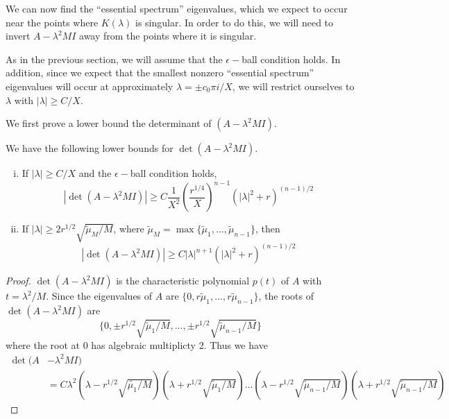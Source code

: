 \documentclass[thesis.tex]{subfiles}
\begin{document}
We can now find the ``essential spectrum'' eigenvalues, which we expect to occur near the points where $K(\lambda)$ is singular. In order to do this, we will need to invert $A - \lambda^2 MI$ away from the points where it is singular.

As in the previous section, we will assume that the $\epsilon-$ball condition holds. In addition, since we expect that the smallest nonzero ``essential spectrum'' eigenvalues will occur at approximately $\lambda = \pm c_0 \pi i / X$, we will restrict ourselves to $\lambda$ with $|\lambda| \geq C/X$.

We first prove a lower bound the determinant of $(A - \lambda^2 MI)$.

\begin{lemma}\label{detAboundlemma}
We have the following lower bounds for $\det(A - \lambda^2 M I)$.
\begin{enumerate}[(i)]
\item If $|\lambda| \geq C/X$ and the $\epsilon-$ball condition holds,
\begin{equation}\label{detAbound1}
|\det(A - \lambda^2 M I)|
\geq C \frac{1}{X^2} \left( \frac{r^{1/4}}{X} \right)^{n-1} \left( |\lambda|^2 + r \right)^{(n-1)/2}
\end{equation}

\item If $|\lambda| \geq 2 r^{1/2} \sqrt{\tilde{\mu}_M/M}$, where $\tilde{\mu}_M = \max\{\tilde{\mu}_1, \dots, \tilde{\mu}_{n-1} \}$, then
\begin{equation}\label{detAbound2}
|\det(A - \lambda^2 M I)|
\geq C |\lambda|^{n+1} \left( |\lambda|^2 + r \right)^{(n-1)/2}
\end{equation}

\end{enumerate}
\begin{proof}
$\det(A - \lambda^2 MI)$ is the characteristic polynomial $p(t)$ of $A$ with $t = \lambda^2 / M$. Since the eigenvalues of $A$ are $\{0, r \tilde{\mu}_1, \dots, r\tilde{\mu}_{n-1}\}$, the roots of $\det(A - \lambda^2 MI)$ are 
\[
\{0, \pm r^{1/2} \sqrt{\tilde{\mu}_1/M}, \dots, \pm r^{1/2} \sqrt{\tilde{\mu}_{n-1}/M}\}
\]
where the root at 0 has algebraic multiplicty 2. Thus we have
\begin{align}\label{detAlambda}
\det(A &- \lambda^2 M I) \\ 
&= C \lambda^2 (\lambda - r^{1/2} \sqrt{\tilde{\mu_1}/M} )(\lambda + r^{1/2} \sqrt{\tilde{\mu}_1/M} )
\dots(\lambda - r^{1/2} \sqrt{\tilde{\mu}_{n-1}/M})(\lambda + r^{1/2} \sqrt{\tilde{\mu}_{n-1}/M} ) \nonumber
\end{align}


\end{proof}
\end{lemma}
\end{document}
